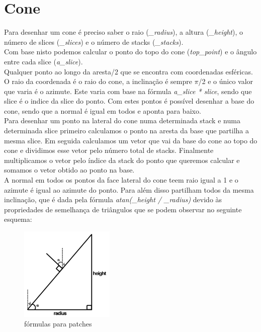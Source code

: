 \documentclass[a4paper]{report}
\begin{document}
\section{Cone}
Para desenhar um cone é preciso saber o raio (\textit{\_radius}), a altura
(\textit{\_height}), o número de slices (\textit{\_slices}) e o número de stacks
(\textit{\_stacks}).\\
Com base nisto podemos calcular o ponto do topo do cone (\textit{top\_point}) e
o ângulo entre cada slice (\textit{a\_slice}).\\
Qualquer ponto ao longo da aresta/2
que se encontra com coordenadas esféricas. O raio da coordenada é o raio do
cone, a inclinação é sempre $\pi$/2 e o único valor que varia é o azimute. Este
varia com base na fórmula \textit{a\_slice * slice}, sendo que slice é o indice
da slice do ponto. Com estes pontos é possível desenhar a base do cone, sendo
que a normal é igual em todos e aponta para baixo.\\
Para desenhar um ponto na lateral do cone numa determinada stack e numa
determinada slice primeiro calculamos o ponto na aresta da base que partilha a
mesma slice. Em seguida calculamos um vetor que vai da base do cone ao topo do
cone e dividimos esse vetor pelo número total de stacks. Finalmente
multiplicamos o vetor pelo índice da stack do ponto que queremos calcular e
somamos o vetor obtido ao ponto na base.\\
A normal em todos os pontos da face lateral do cone teem raio igual a 1 e o
azimute é igual ao azimute do ponto. Para além disso partilham todos da mesma
inclinação, que é dada pela fórmula \textit{atan(\_height / \_radius)} devido às
propriedades de semelhança de triângulos que se podem observar no seguinte
esquema:
\begin{figure}[H]
    \centering 
    \includegraphics[width=0.4\textwidth]{images/semelhanca.png}  
    \caption{fórmulas para patches}
\end{figure}
\end{document}
